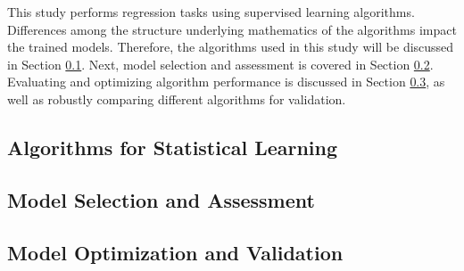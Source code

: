 This study performs regression tasks using supervised learning algorithms.
Differences among the structure underlying mathematics of the algorithms impact the
trained models.  Therefore, the algorithms used in this study will be discussed
in Section \ref{sec:algs}. Next, model selection and assessment is covered in
Section \ref{sec:selectass}.  Evaluating and optimizing algorithm performance
is discussed in Section \ref{sec:optvalid}, as well as robustly comparing
different algorithms for validation.

\subsection{Algorithms for Statistical Learning}
\label{sec:algs}


\subsection{Model Selection and Assessment}
\label{sec:selectass}


\subsection{Model Optimization and Validation}
\label{sec:optvalid}

